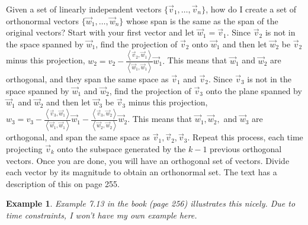 \documentclass[10pt]{article}
\theoremstyle{plain}
\theoremstyle{box}
\newtheorem{example}{Example}
\begin{document}
Given a set of linearly independent vectors $\{\vec v_1,\ldots,\vec v_n\}$, how do I create a set of orthonormal vectors $\{\vec w_1,\ldots,\vec w_n\}$ whose span is the same as the span of the original vectors?  Start with your first vector and let $\vec w_1 = \vec v_1$.  Since $\vec v_2$ is not in the space spanned by $\vec w_1$, find the projection of $\vec v_2$ onto $\vec w_1$ and then let $\vec w_2$ be $\vec v_2$ minus this projection, $w_2 = v_2 - \frac{\left<\vec v_2,\vec w_1\right>}{\left<\vec w_1,\vec w_1\right>}\vec w_1.$ This means that $\vec w_1$ and $\vec w_2$ are orthogonal, and they span the same space as $\vec v_1$ and $\vec v_2$.  Since $\vec v_3$ is not in the space spanned by $\vec w_1$ and $\vec w_2$, find the projection of $\vec v_3$ onto the plane spanned by $\vec w_1$ and $\vec w_2$ and then let $\vec w_3$ be $\vec v_3$ minus this projection, 
$w_3 = v_3 
- \frac{\left<\vec v_3,\vec w_1\right>}{\left<\vec w_1,\vec w_1\right>}\vec w_1
- \frac{\left<\vec v_3,\vec w_2\right>}{\left<\vec w_2,\vec w_2\right>}\vec w_2.$ This means that $\vec w_1, \vec w_2,$ and $\vec w_3$ are orthogonal, and span the same space as $\vec v_1, \vec v_2, \vec v_3$.  Repeat this process, each time projecting $\vec v_k$ onto the subspace generated by the $k-1$ previous orthogonal vectors.  Once you are done, you will have an orthogonal set of vectors.  Divide each vector by its magnitude to obtain an orthonormal set.  The text has a description of this on page 255.


\begin{example}
Example 7.13 in the book (page 256) illustrates this nicely. Due to time constraints, I won't have my own example here.
\end{example}
\end{document}

